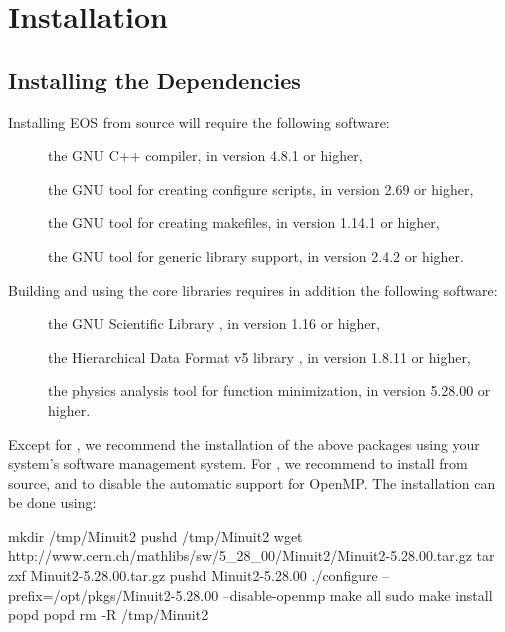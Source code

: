\chapter{Installation}

\section{Installing the Dependencies}

Installing EOS from source will require the following software:
\begin{description}
    \item[] the GNU C++ compiler, in version 4.8.1 or higher,
    \item[] the GNU tool for creating configure scripts, in version 2.69 or higher,
    \item[] the GNU tool for creating makefiles, in version 1.14.1 or higher,
    \item[] the GNU tool for generic library support, in version 2.4.2 or higher.
\end{description}
%
Building and using the core libraries requires in addition the following software:
\begin{description}
    \item[] the GNU Scientific Library \cite{GSL}, in version 1.16 or higher,
    \item[] the Hierarchical Data Format v5 library \cite{HDF5}, in version 1.8.11 or higher,
    \item[] the physics analysis tool for function minimization, in version 5.28.00 or higher.
\end{description}
Except for , we recommend the installation of the above packages using your system's
software management system. For , we recommend to install from source, and to disable
the automatic support for OpenMP. The installation can be done using:
\begin{commandline}
mkdir /tmp/Minuit2
pushd /tmp/Minuit2
wget http://www.cern.ch/mathlibs/sw/5_28_00/Minuit2/Minuit2-5.28.00.tar.gz
tar zxf Minuit2-5.28.00.tar.gz
pushd Minuit2-5.28.00
./configure --prefix=/opt/pkgs/Minuit2-5.28.00 --disable-openmp
make all
sudo make install
popd
popd
rm -R /tmp/Minuit2
\end{commandline}

